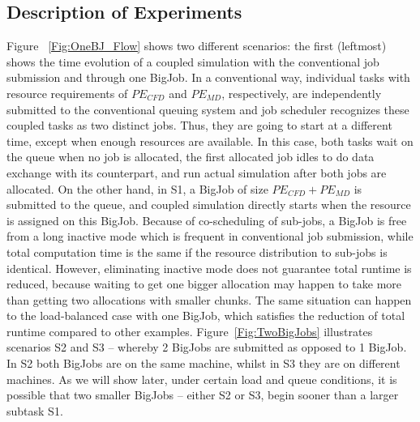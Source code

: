 \documentclass[conference,final]{IEEEtran}
\begin{document}

\subsection{Description of Experiments}

Figure ~\ref{Fig:OneBJ_Flow} shows two different scenarios: the first
(leftmost) shows the time evolution of a coupled simulation with the
conventional job submission and through one BigJob. In a conventional
way, individual tasks with resource requirements of $PE_{CFD}$ and
$PE_{MD}$, respectively, are independently submitted to the
conventional queuing system and job scheduler recognizes these coupled
tasks as two distinct jobs. Thus, they are going to start at a
different time, except when enough resources are available. In this
case, both tasks wait on the queue when no job is allocated, the first
allocated job idles to do data exchange with its counterpart, and run
actual simulation after both jobs are allocated. On the other hand, in
S1, a BigJob of size $PE_{CFD}+PE_{MD}$
is submitted to the queue, and coupled simulation directly starts when the resource is assigned on this BigJob. Because of co-scheduling of sub-jobs, a BigJob is free from a long inactive mode which is frequent in conventional job submission, while total computation time is the same if the resource distribution to sub-jobs is identical. However, eliminating
inactive mode does not guarantee total runtime is reduced,
because waiting to get one bigger allocation may happen to take more
than getting two allocations with smaller chunks. The same situation
can happen to the load-balanced case with one BigJob, which satisfies
the reduction of total runtime compared to other examples.
Figure~\ref{Fig:TwoBigJobs} illustrates scenarios S2 and S3 -- whereby
2 BigJobs are submitted as opposed to 1 BigJob. In S2 both BigJobs are
on the same machine, whilst in S3 they are on different machines.  As
we will show later, under certain load and queue conditions, it is
possible that two smaller BigJobs -- either S2 or S3, begin sooner
than a larger subtask S1.
\end{document}
